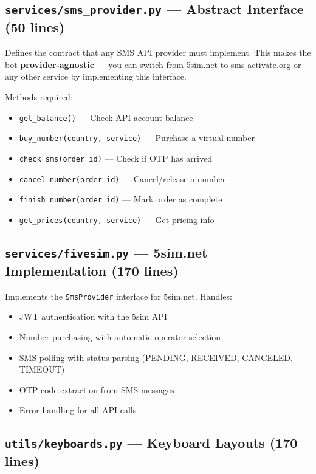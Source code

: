 \subsection{\texttt{services/sms\_provider.py} --- Abstract Interface (50 lines)}

Defines the contract that any SMS API provider must implement. This makes the bot \textbf{provider-agnostic} --- you can switch from 5sim.net to sms-activate.org or any other service by implementing this interface.

Methods required:
\begin{itemize}
    \item \texttt{get\_balance()} --- Check API account balance
    \item \texttt{buy\_number(country, service)} --- Purchase a virtual number
    \item \texttt{check\_sms(order\_id)} --- Check if OTP has arrived
    \item \texttt{cancel\_number(order\_id)} --- Cancel/release a number
    \item \texttt{finish\_number(order\_id)} --- Mark order as complete
    \item \texttt{get\_prices(country, service)} --- Get pricing info
\end{itemize}

\subsection{\texttt{services/fivesim.py} --- 5sim.net Implementation (170 lines)}

Implements the \texttt{SmsProvider} interface for 5sim.net. Handles:
\begin{itemize}
    \item JWT authentication with the 5sim API
    \item Number purchasing with automatic operator selection
    \item SMS polling with status parsing (PENDING, RECEIVED, CANCELED, TIMEOUT)
    \item OTP code extraction from SMS messages
    \item Error handling for all API calls
\end{itemize}

\subsection{\texttt{utils/keyboards.py} --- Keyboard Layouts (170 lines)}

